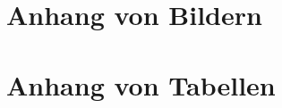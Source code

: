 \chapter{Anhang von Bildern}
\label{cha:anhang_bilder}

\chapter{Anhang von Tabellen}
\label{cha:anhang_tabellen}
